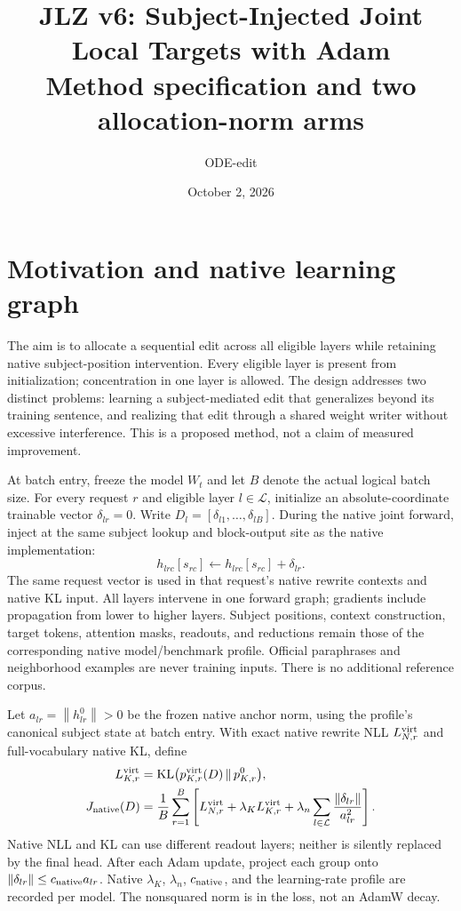 \documentclass[10pt]{article}
\title{JLZ v6: Subject-Injected Joint Local Targets with Adam\\
\large Method specification and two allocation-norm arms}
\author{ODE-edit}
\date{October 2, 2026}
\newcommand{\KL}{\operatorname{KL}}
\newcommand{\norm}[1]{\left\lVert#1\right\rVert}
\begin{document}
\maketitle
\vspace{-1.5em}

\section{Motivation and native learning graph}
The aim is to allocate a sequential edit across all eligible layers while
retaining native subject-position intervention. Every eligible layer is
present from initialization; concentration in one layer is allowed.
The design addresses two distinct problems: learning a subject-mediated
edit that generalizes beyond its training sentence, and realizing that
edit through a shared weight writer without excessive interference.
This is a proposed method, not a claim of measured improvement.

At batch entry, freeze the model $W_t$ and let $B$ denote the actual
logical batch size. For every request $r$ and eligible layer $l\in\mathcal L$,
initialize an absolute-coordinate trainable vector $\delta_{lr}=0$.
Write $D_l=[\delta_{l1},\ldots,\delta_{lB}]$. During the native joint
forward, inject at the same subject lookup and block-output site as the
native implementation:
\[
 h_{lrc}[s_{rc}]\leftarrow h_{lrc}[s_{rc}]+\delta_{lr}.
\]
The same request vector is used in that request's native rewrite contexts
and native KL input. All layers intervene in one forward graph; gradients
include propagation from lower to higher layers. Subject positions,
context construction, target tokens, attention masks, readouts, and
reductions remain those of the corresponding native model/benchmark
profile. Official paraphrases and neighborhood examples are never training
inputs. There is no additional reference corpus.

Let $a_{lr}=\norm{h^0_{lr}}>0$ be the frozen native anchor norm, using the
profile's canonical subject state at batch entry. With exact native
rewrite NLL $L^{\rm virt}_{N,r}$ and full-vocabulary native KL, define
\begin{align}
 L^{\rm virt}_{K,r}
 &=\KL\bigl(p^{\rm virt}_{K,r}(D)\,\Vert\,p^0_{K,r}\bigr),\\
 J_{\rm native}(D)
 &=\frac1B\sum_{r=1}^{B}\left[
 L^{\rm virt}_{N,r}+\lambda_K L^{\rm virt}_{K,r}
 +\lambda_n\sum_{l\in\mathcal L}\frac{\norm{\delta_{lr}}}{a_{lr}^{2}}
 \right]. \label{eq:native}
\end{align}
Native NLL and KL can use different readout layers; neither is silently
replaced by the final head. After each Adam update, project each group
onto $\norm{\delta_{lr}}\leq c_{\rm native}a_{lr}$. Native $\lambda_K$,
$\lambda_n$, $c_{\rm native}$, and the learning-rate profile are recorded
per model. The nonsquared norm is in the loss, not an AdamW decay.
\end{document}
